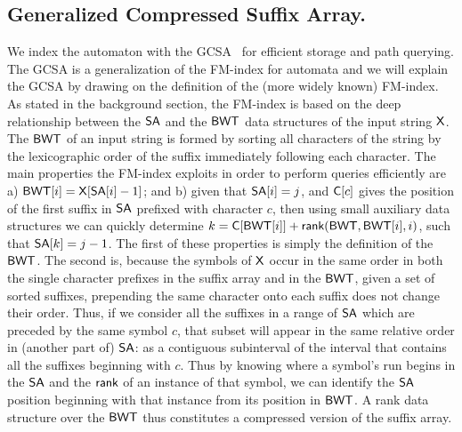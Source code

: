 \subsection{Generalized Compressed Suffix Array.}


We index the automaton with the GCSA~\cite{dag_method} for efficient storage and path querying.  The GCSA is a generalization of the FM-index for automata and
we will explain the GCSA by drawing on the definition of the (more widely known) FM-index.  As stated in the background section, the FM-index is based on the deep relationship between the $\mbox{\rm {\sf SA}}$ and the $\mbox{\rm {\sf BWT}}$ data structures of the input string $\mathsf{X}$. The $\mbox{\rm {\sf BWT}}$ of an input string is formed by sorting all characters of the string by the lexicographic order of the suffix immediately following each character.  The main properties the FM-index exploits in order to perform queries efficiently are a) $\mbox{\rm {\sf BWT}}[i] = \mathsf{X}[\mbox{\rm {\sf SA}}[i]-1]$; and 
b) given that $\mbox{\rm {\sf SA}}[i] = j$, and $\mbox{\rm {\sf C}}[c]$ gives the position of the first suffix in $\mbox{\rm {\sf SA}}$ prefixed with character $c$, then using small auxiliary data structures we can quickly determine $k = \mbox{\rm {\sf C}}[\mbox{\rm {\sf BWT}}[i]] + \textsf{rank}(\mbox{\rm {\sf BWT}},\mbox{\rm {\sf BWT}}[i],i)$, such that $\mbox{\rm {\sf SA}}[k] = j-1$.
The first of these properties is simply the definition of the $\mbox{\rm {\sf BWT}}$.  The second is, because the symbols of $\mathsf{X}$ occur in the same order in both the single character prefixes in the suffix array and in the $\mbox{\rm {\sf BWT}}$, given a set of sorted suffixes, prepending the same character onto each suffix does not change their order. Thus, if we consider all the suffixes in a range of $\mbox{\rm {\sf SA}}$ which are preceded by the same symbol $c$, that subset will appear in the same relative order in (another part of) $\mbox{\rm {\sf SA}}$: as a contiguous subinterval of the interval that contains all the suffixes beginning with $c$. Thus by knowing where a symbol's run begins in the $\mbox{\rm {\sf SA}}$ and the $\textsf{rank}$ of an instance of that symbol, we can identify the $\mbox{\rm {\sf SA}}$ position beginning with that instance from its position in $\mbox{\rm {\sf BWT}}$. A rank data structure over the $\mbox{\rm {\sf BWT}}$ thus constitutes a compressed version of the suffix array. 

